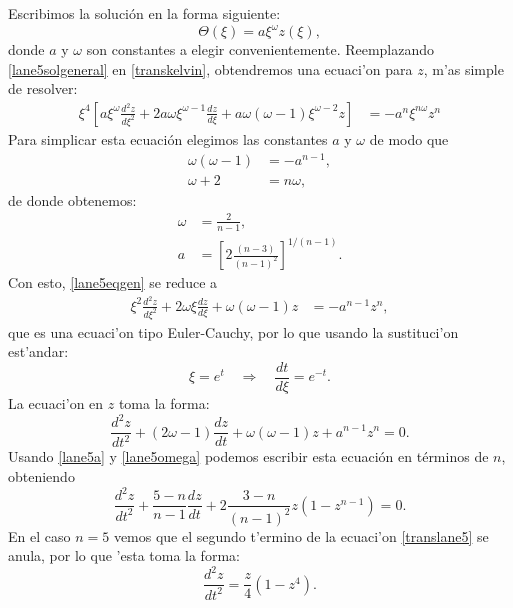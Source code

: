 Escribimos la solución en la forma siguiente:
\begin{equation}\label{lane5solgeneral}
 \Theta(\xi)=a\xi^{\omega}z(\xi),
\end{equation}
donde $a$ y $\omega$ son constantes a elegir convenientemente. Reemplazando \eqref{lane5solgeneral} en \eqref{transkelvin}, obtendremos una ecuaci'on  para $z$, m'as simple de resolver:
\begin{align}\label{lane5eqgen}
 \xi^4\left[a\xi^{\omega}\frac{d^2 z}{d\xi^2}+2a\omega\xi^{\omega-1}\frac{dz}{d\xi}+a\omega(\omega-1)\xi^{\omega-2}z\right]&=-a^{n}\xi^{n\omega}z^n
 \end{align}
 Para simplicar esta ecuación elegimos las constantes $a$ y $\omega$ de modo que
\begin{align}
\omega(\omega-1)&=-a^{n-1},\label{lane5a}\\
\omega+2&=n\omega,
\end{align}
de donde obtenemos:
\begin{align}
\omega&=\frac{2}{n-1} \label{lane5omega},\\
a&=\left[2\frac{(n-3)}{(n-1)^2}\right]^{1/(n-1)}\label{lane5a2}.
\end{align}
Con esto, \eqref{lane5eqgen} se reduce a 
\begin{align}
\xi^2\frac{d^2 z}{d\xi^2}+2\omega\xi\frac{dz}{d\xi}+\omega(\omega-1)z&=-a^{n-1}z^n,
\end{align}
que es una ecuaci'on tipo Euler-Cauchy, por lo que usando la sustituci'on est'andar:
\begin{equation}\label{euler-sust}
 \xi=e^{t}\quad\Rightarrow\quad \frac{dt}{d\xi}=e^{-t}.
\end{equation}
La ecuaci'on en $z$ toma la forma:
\begin{equation}
 \frac{d^2 z}{dt^2}+(2\omega-1)\frac{dz}{dt}+\omega(\omega-1)z+a^{n-1}z^n=0.
\end{equation}
Usando \eqref{lane5a} y \eqref{lane5omega} podemos escribir esta ecuación en términos de $n$, obteniendo
\begin{equation}\label{translane5}
 \frac{d^2 z}{dt^2}+\frac{5-n}{n-1}\frac{dz}{dt}+2\frac{3-n}{(n-1)^2}z(1-z^{n-1})=0.
\end{equation}
En el caso $n=5$ vemos que el segundo t'ermino de la ecuaci'on \eqref{translane5} se anula, por lo que 'esta toma la forma:
\begin{equation}\label{translane5b}
 \frac{d^2 z}{dt^2}=\frac{z}{4}(1-z^4).
\end{equation}
